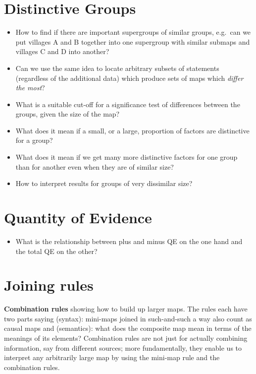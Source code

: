 \documentclass[
]{book}
\providecommand{\tightlist}{%
  \setlength{\itemsep}{0pt}\setlength{\parskip}{0pt}}
\begin{document}
\hypertarget{distinctive-groups}{%
\section{Distinctive Groups}\label{distinctive-groups}}

\begin{itemize}
\item
  How to find if there are important supergroups of similar groups, e.g.~can we put villages A and B together into one supergroup with similar submaps and villages C and D into another?
\item
  Can we use the same idea to locate arbitrary subsets of statements (regardless of the additional data) which produce sets of maps which \emph{differ the most}?
\item
  What is a suitable cut-off for a significance test of differences between the groups, given the size of the map?
\item
  What does it mean if a small, or a large, proportion of factors are distinctive for a group?
\item
  What does it mean if we get many more distinctive factors for one group than for another even when they are of similar size?
\item
  How to interpret results for groups of very dissimilar size?
\end{itemize}

\hypertarget{quantity-of-evidence}{%
\section{Quantity of Evidence}\label{quantity-of-evidence}}

\begin{itemize}
\tightlist
\item
  What is the relationship between plus and minus QE on the one hand and the total QE on the other?
\end{itemize}

\hypertarget{joining-rules}{%
\section{Joining rules}\label{joining-rules}}

\textbf{Combination rules} showing how to build up larger maps. The rules each have two parts saying (syntax): mini-maps joined in such-and-such a way also count as causal maps and (semantics): what does the composite map mean in terms of the meanings of its elements? Combination rules are not just for actually combining information, say from different sources; more fundamentally, they enable us to interpret any arbitrarily large map by using the mini-map rule and the combination rules.
\end{document}
